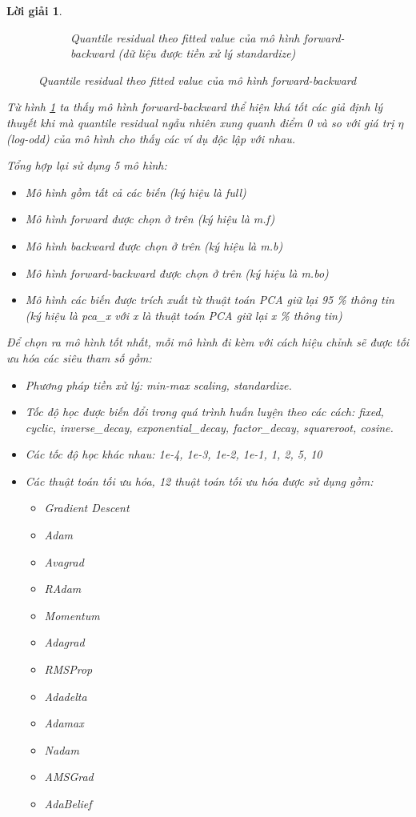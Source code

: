 \documentclass[14pt, a4paper]{article}
\theoremstyle{sltheorem}
\theoremstyle{soltheorem}
\newtheorem*{loigiai}{Lời giải}
\begin{document}
\begin{loigiai}
\begin{figure}[h!]
\begin{subfigure}[b]{0.4\textwidth}
            \caption{Quantile residual theo fitted value của mô hình forward-backward (dữ liệu được tiền xử lý standardize)}
        \end{subfigure}
        \caption{Quantile residual theo fitted value của mô hình forward-backward}
        \label{fig:Quantile-fitted-mbo}
    \end{figure}

    Từ hình \ref{fig:Quantile-fitted-mbo} ta thấy mô hình forward-backward thể hiện khá tốt các giả định lý
    thuyết khi mà quantile residual ngẫu nhiên xung quanh điểm 0 và so với giá trị $\eta$ (log-odd) của mô
    hình cho thấy các ví dụ độc lập với nhau.

    Tổng hợp lại sử dụng 5 mô hình:

    \begin{itemize}
        \item Mô hình gồm tất cả các biến (ký hiệu là full)
        \item Mô hình forward được chọn ở trên (ký hiệu là m.f)
        \item Mô hình backward được chọn ở trên (ký hiệu là m.b)
        \item Mô hình forward-backward được chọn ở trên (ký hiệu là m.bo)
        \item Mô hình các biến được trích xuất từ thuật toán PCA giữ lại 95 \% thông tin (ký hiệu là pca\_x với x là thuật toán PCA giữ lại x \% thông tin)
    \end{itemize}

    Để chọn ra mô hình tốt nhất, mỗi mô hình đi kèm với cách hiệu chỉnh sẽ được tối ưu hóa các siêu tham số gồm:

    \begin{itemize}
        \item Phương pháp tiền xử lý: min-max scaling, standardize.
        \item Tốc độ học được biến đổi trong quá trình huấn luyện theo các cách: fixed, cyclic, inverse\_decay, exponential\_decay, factor\_decay, squareroot, cosine.
        \item Các tốc độ học khác nhau: 1e-4, 1e-3, 1e-2, 1e-1, 1, 2, 5, 10
        \item Các thuật toán tối ưu hóa, 12 thuật toán tối ưu hóa được sử dụng gồm:
        \begin{itemize}
            \item Gradient Descent
            \item Adam
            \item Avagrad
            \item RAdam
            \item Momentum
            \item Adagrad
            \item RMSProp
            \item Adadelta
            \item Adamax
            \item Nadam
            \item AMSGrad
            \item AdaBelief
        \end{itemize}


\end{itemize}
\end{loigiai}
\end{document}
